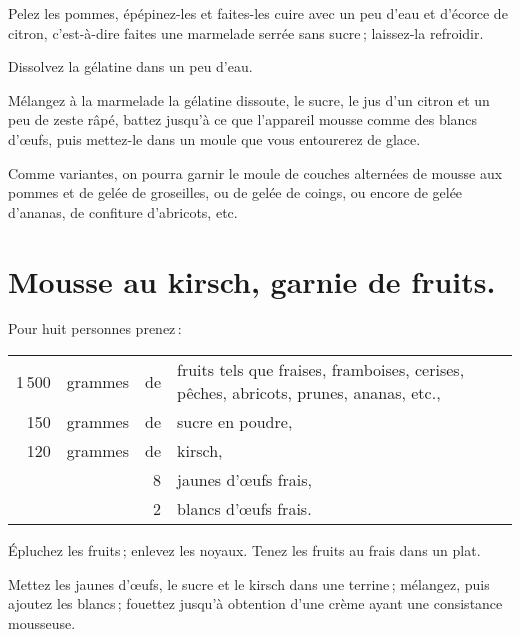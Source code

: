 Pelez les pommes, épépinez-les et faites-les cuire avec un peu d'eau et
d'écorce de citron, c'est-à-dire faites une marmelade serrée sans sucre ;
laissez-la refroidir.

Dissolvez la gélatine dans un peu d’eau.

Mélangez à la marmelade la gélatine dissoute, le sucre, le jus d'un citron et
un peu de zeste râpé, battez jusqu'à ce que l'appareil mousse comme des blancs
d'œufs, puis mettez-le dans un moule que vous entourerez de glace.

\sk

Comme variantes, on pourra garnir le moule de couches alternées de mousse aux
pommes et de gelée de groseilles, ou de gelée de coings, ou encore de gelée
d'ananas, de confiture d'abricots, etc.

\section*{\centering Mousse au kirsch, garnie de fruits.}
{}

Pour huit personnes prenez :

\footnotesize
\begin{longtable}{rrrp{16em}}
  1 500 & grammes & de & fruits tels que fraises, framboises, cerises, pêches,
                         abricots, prunes, ananas, etc.,                                                  \\
    150 & grammes & de & sucre en poudre,                                                                 \\
    120 & grammes & de & kirsch,                                                                          \\
        &         &  8 & jaunes d'œufs frais,                                                             \\
        &         &  2 & blancs d'œufs frais.                                                             \\
\end{longtable}
\normalsize

Épluchez les fruits ; enlevez les noyaux. Tenez les fruits au frais dans un
plat.

Mettez les jaunes d'œufs, le sucre et le kirsch dans une terrine ; mélangez, puis
ajoutez les blancs ; fouettez jusqu'à obtention d'une crème ayant une consistance
mousseuse.

